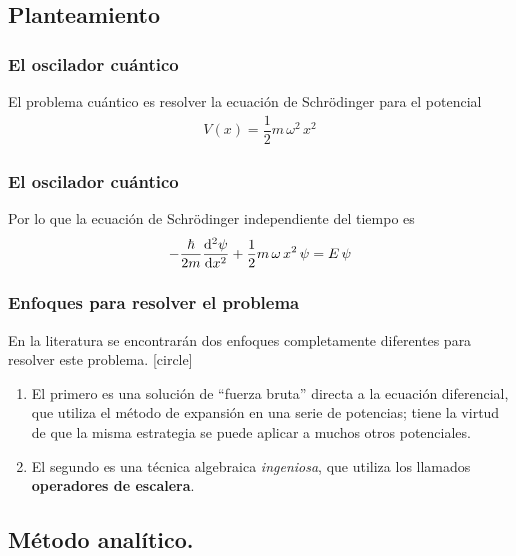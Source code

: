 \documentclass[12pt]{beamer}
\begin{document}
\subsection{Planteamiento}

\begin{frame}
\frametitle{El oscilador cuántico}
El problema cuántico es resolver la ecuación de Schrödinger para el potencial
\begin{align}
    V(x) = \dfrac{1}{2} m \, \omega^{2} \, x^{2}
    \label{eq:ecuacion_02_038}
\end{align}
\end{frame}
\begin{frame}
\frametitle{El oscilador cuántico}
Por lo que la ecuación de Schrödinger independiente del tiempo es
\begin{align}
    - \dfrac{\hbar}{2 m} \dv[2]{\psi}{x} + \dfrac{1}{2} m \, \omega \, x^{2} \, \psi = E \, \psi
    \label{eq:ecuacion_02_039}
\end{align}
\end{frame}
\begin{frame}
\frametitle{Enfoques para resolver el problema}
En la literatura se encontrarán dos enfoques completamente diferentes para resolver este problema.
[circle]
\begin{enumerate}[<+->]
\item El primero es una solución de \enquote{fuerza bruta} directa a la ecuación diferencial, que utiliza el método de expansión en una serie de potencias; tiene la virtud de que la misma estrategia se puede aplicar a muchos otros potenciales.
\item El segundo es una técnica algebraica \emph{ingeniosa}, que utiliza los llamados \textbf{operadores de escalera}.
\end{enumerate}
\end{frame}

\subsection{Método analítico.}
\end{document}
